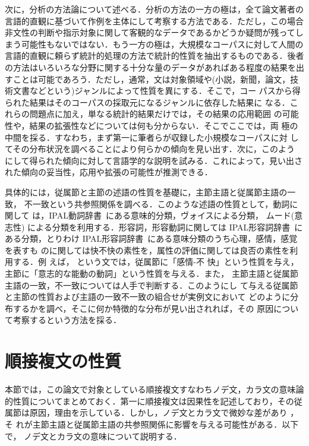 次に，分析の方法論について述べる．分析の方法の一方の極は，全て論文著者の
言語的直観に基づいて作例を主体にして考察する方法である．ただし，この場合
非文性の判断や指示対象に関して客観的なデータであるかどうか疑問が残ってし
まう可能性もないではない．もう一方の極は，大規模なコーパスに対して人間の
言語的直観に頼らず統計的処理の方法で統計的性質を抽出するものである．後者
の方法はいろいろな分野に関する十分な量のデータがあればある程度の結果を出
すことは可能であろう．ただし，通常，文は対象領域や(小説，新聞，論文，技
術文書などという)ジャンルによって性質を異にする．そこで，コー
パスから得られた結果はそのコーパスの採取元になるジャンルに依存した結果に
なる．これらの問題点に加え，単なる統計的結果だけでは，その結果の応用範囲
の可能性や，結果の拡張性などについては何も分からない．そこでここでは，両
極の中間を採る．すなわち，まず第一に筆者らが収録した小規模なコーパスに対
してその分布状況を調べることにより何らかの傾向を見い出す．次に，このよう
にして得られた傾向に対して言語学的な説明を試みる．これによって，見い出さ
れた傾向の妥当性，応用や拡張の可能性が推測できる．

具体的には，従属節と主節の述語の性質を基礎に，主節主語と従属節主語の一致，
不一致という共参照関係を調べる．このような述語の性質として，動詞に関して
は，IPAL動詞辞書~\cite{IPALverb}にある意味的分類，ヴォイスによる分類，
ムード(意志性)
による分類を利用する．形容詞，形容動詞に関しては
IPAL形容詞辞書~\cite{IPALadj}にある分類，とりわけ
IPAL形容詞辞書~\cite{IPALadj}にある意味分類のうち心理，感情，感覚を表すも
のに関しては快不快の素性を，属性の評価に関しては良否の素性を利用する．例
えば，
という文では，従属節に「感情-不
快」という性質を与え，主節に「意志的な能動の動詞」という性質を与える．また，
主節主語と従属節主語の一致，不一致については人手で判断する．このようにし
て与える従属節と主節の性質および主語の一致不一致の組合せが実例文において
どのように分布するかを調べ，そこに何か特徴的な分布が見い出されれば，その
原因について考察するという方法を採る．

\section{順接複文の性質}\label{node-kara}

本節では，この論文で対象としている順接複文すなわちノデ文，カラ文の意味論
的性質についてまとめておく．第一に順接複文は因果性を記述しており，その従
属節は原因，理由を示している．しかし，ノデ文とカラ文で微妙な差があり
\cite{日本語の複文構造,カラノデ}，そ
れが主節主語と従属節主語の共参照関係に影響を与える可能性がある．以下で，
ノデ文とカラ文の意味について説明する．

